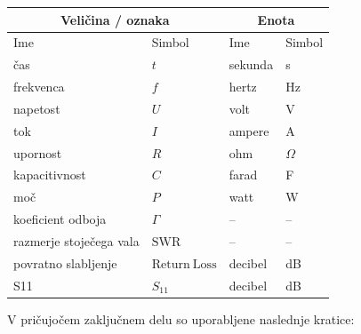 \documentclass[a4paper,twoside,openright,12pt,slovene]{book}
\begin{document}
\begin{center}
    \begin{tabular}{*{4}{l}} \hline
        \multicolumn{2}{c}{\bf{Veličina / oznaka}} & \multicolumn{2}{c}{\bf{Enota}} \\ \hline
        Ime & Simbol & Ime & Simbol \\ \hline
        čas & $t$ & sekunda & s \\
        frekvenca & $f$ & hertz & Hz \\
        napetost & $U$ & volt & V \\
        tok & $I$ & ampere & A \\
        upornost & $R$ & ohm & $\Omega$ \\
        kapacitivnost & $C$ & farad & F \\
        moč & $P$ & watt & W \\
        koeficient odboja & $\Gamma$ & -- & -- \\
        razmerje stoječega vala & $\mathrm{SWR}$ & -- & -- \\
        povratno slabljenje & $\mathrm{Return\ Loss}$ & decibel & dB \\
        S11 & $S_{11}$ & decibel & dB \\


    \end{tabular}
\end{center}

\seznamkratic
V pričujočem zaključnem delu so uporabljene naslednje kratice:
\end{document}
